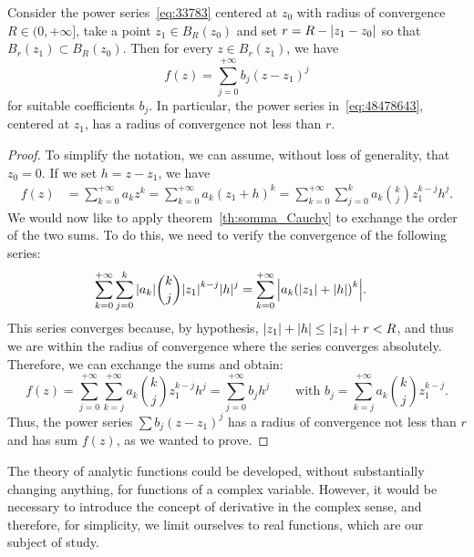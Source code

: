 \begin{theorem}
%
%
\label{th:488456367}
Consider the power series~\eqref{eq:33783} centered at $z_0$ with radius of
convergence $R\in (0,+\infty]$, take a point $z_1 \in B_R(z_0)$ and set
$r=R-{\left|z_1-z_0\right|}$ so that $B_r(z_1)\subset B_R(z_0)$. Then for every $z\in
B_r(z_1)$, we have
\begin{equation}\label{eq:48478643}
  f(z) = \sum_{j=0}^{+\infty} b_j (z - z_1)^j
\end{equation}
for suitable coefficients $b_j$. In particular, the power series
in~\eqref{eq:48478643}, centered at $z_1$, has a radius of convergence not less
than $r$.
\end{theorem}
%
\begin{proof}
To simplify the notation, we can assume, without loss of generality, that
$z_0=0$. If we set $h=z-z_1$, we have
\begin{align*}
f(z) 
&= \sum_{k=0}^{+\infty} a_k z^k 
= \sum_{k=0}^{+\infty} a_k (z_1+h)^k
= \sum_{k=0}^{+\infty} \sum_{j=0}^k a_k {k \choose j}z_1^{k-j}h^j.
\end{align*}
We would now like to apply theorem~\ref{th:somma_Cauchy} to exchange the order
of the two sums. To do this, we need to verify the convergence of the following
series:
\begin{align*}
  \sum_{k=0}^{+\infty} \sum_{j=0}^k {\left|a_k\right|} {k \choose j}{\left|z_1\right|}^{k-j}{\left|h\right|}^j 
  &= \sum_{k=0}^{+\infty} {\left|a_k {\left( {\left|z_1\right|}+{\left|h\right|} \right)}^k\right|}.
\end{align*}
This series converges because, by hypothesis, ${\left|z_1\right|}+{\left|h\right|} \le {\left|z_1\right|} +
r < R$, and thus we are within the radius of convergence where the series
converges absolutely. Therefore, we can exchange the sums and obtain:
\[
    f(z) = \sum_{j=0}^{+\infty} \sum_{k=j}^{+\infty} a_k {k\choose j} z_1^{k-j}
  h^j
    = \sum_{j=0}^{+\infty} b_j h^j
  \qquad\text{with }
b_j = \sum_{k=j}^{+\infty}
 a_k {k\choose j}z_1^{k-j}.
\]
Thus, the power series $\sum b_j (z-z_1)^j$ has a radius of convergence not less
than $r$ and has sum $f(z)$, as we wanted to prove.
\end{proof}

The theory of analytic functions could be developed, without substantially
changing anything, for functions of a complex variable. However, it would be
necessary to introduce the concept of derivative in the complex sense, and
therefore, for simplicity, we limit ourselves to real functions, which are our
subject of study.

